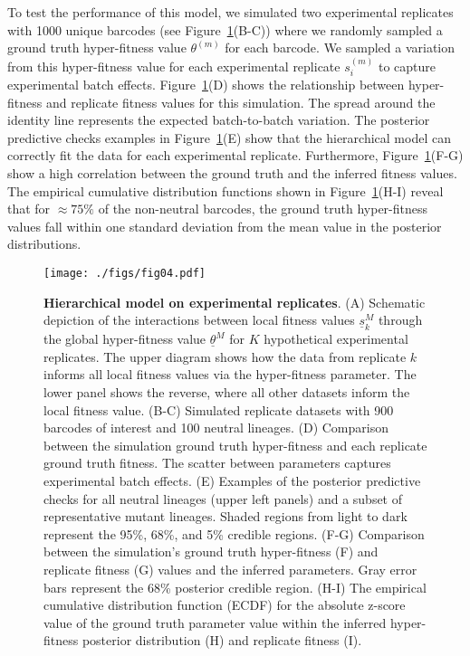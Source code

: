 \documentclass[
]{scrartcl}
\begin{document}
\begin{refsegment}
To test the performance of this model, we simulated two experimental
replicates with 1000 unique barcodes (see Figure~\ref{fig-04}(B-C))
where we randomly sampled a ground truth hyper-fitness value
\(\theta^{(m)}\) for each barcode. We sampled a variation from this
hyper-fitness value for each experimental replicate \(s^{(m)}_i\) to
capture experimental batch effects. Figure~\ref{fig-04}(D) shows the
relationship between hyper-fitness and replicate fitness values for this
simulation. The spread around the identity line represents the expected
batch-to-batch variation. The posterior predictive checks examples in
Figure~\ref{fig-04}(E) show that the hierarchical model can correctly
fit the data for each experimental replicate. Furthermore,
Figure~\ref{fig-04}(F-G) show a high correlation between the ground
truth and the inferred fitness values. The empirical cumulative
distribution functions shown in Figure~\ref{fig-04}(H-I) reveal that for
\(\approx 75\%\) of the non-neutral barcodes, the ground truth
hyper-fitness values fall within one standard deviation from the mean
value in the posterior distributions.

\begin{figure}

{\centering \texttt{[image: ./figs/fig04.pdf]}

}

\caption{\label{fig-04}\textbf{Hierarchical model on experimental
replicates}. (A) Schematic depiction of the interactions between local
fitness values \(\underline{s}_k^M\) through the global hyper-fitness
value \(\underline{\theta}^M\) for \(K\) hypothetical experimental
replicates. The upper diagram shows how the data from replicate \(k\)
informs all local fitness values via the hyper-fitness parameter. The
lower panel shows the reverse, where all other datasets inform the local
fitness value. (B-C) Simulated replicate datasets with 900 barcodes of
interest and 100 neutral lineages. (D) Comparison between the simulation
ground truth hyper-fitness and each replicate ground truth fitness. The
scatter between parameters captures experimental batch effects. (E)
Examples of the posterior predictive checks for all neutral lineages
(upper left panels) and a subset of representative mutant lineages.
Shaded regions from light to dark represent the 95\%, 68\%, and 5\%
credible regions. (F-G) Comparison between the simulation's ground truth
hyper-fitness (F) and replicate fitness (G) values and the inferred
parameters. Gray error bars represent the 68\% posterior credible
region. (H-I) The empirical cumulative distribution function (ECDF) for
the absolute z-score value of the ground truth parameter value within
the inferred hyper-fitness posterior distribution (H) and replicate
fitness (I).}


\end{figure}
\end{refsegment}
\end{document}
